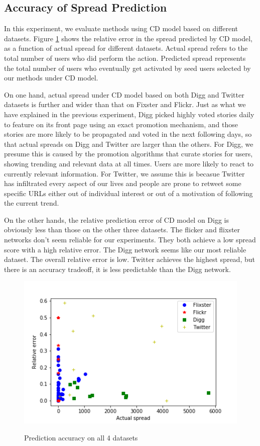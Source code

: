 \documentclass{acm_proc_article-sp}
\begin{document}
\subsection*{Accuracy of Spread Prediction}
In this experiment, we evaluate methods using CD model based on different datasets. Figure \ref{accuracy} shows the relative error in the spread predicted by CD model, as a function of actual spread for different datasets. Actual spread refers to the total number of users who did perform the action. Predicted spread represents the total number of users who eventually get activated by seed users selected by our methods under CD model.

On one hand, actual spread under CD model based on both Digg and Twitter datasets is further and wider than that on Fixster and Flickr. Just as what we have explained in the previous experiment, Digg picked highly voted stories daily to feature on its front page using an exact promotion mechanism, and those stories are more likely to be propagated and voted in the next following days, so that actual spreads on Digg and Twitter are larger than the others. For Digg, we presume this is caused by the promotion algorithms that curate stories for users, showing trending and relevant data at all times. Users are more likely to react to currently relevant information. For Twitter, we assume this is becasue Twitter has infiltrated every aspect of our lives and people are prone to retweet some specific URLs either out of individual interest or out of a motivation of following the current trend.  

On the other hands, the relative prediction error of CD model on Digg is obviously less than those on the other three datasets. The flicker and flixster networks don't seem reliable for our experiments. They both achieve a low spread score with a high relative error. The Digg network seems like our most reliable dataset. The overall relative error is low. Twitter achieves the highest spread, but there is an accuracy tradeoff, it is less predictable than the Digg network.

\begin{figure}[h]
	\includegraphics[width=\linewidth]{accuracy.png}
	\centering
	\label{accuracy}
    \caption{Prediction accuracy on all 4 datasets}
\end{figure}
\end{document}
